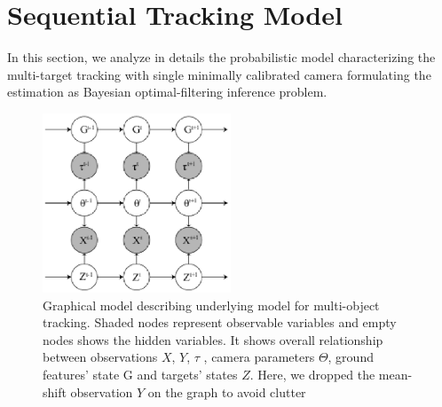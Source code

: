 \section{Sequential Tracking Model}
In this section, we analyze in details the probabilistic model characterizing the  multi-target tracking with single minimally calibrated camera formulating the estimation as  Bayesian optimal-filtering inference problem.\\
\begin{figure}\label{fig: gm_mtt1}
\includegraphics[width=0.5\textwidth]{ImaginiLatex/gm_mtt1.eps} 
\caption{ Graphical model describing underlying model for multi-object tracking. Shaded
nodes represent observable variables and empty nodes shows the hidden variables.
It shows overall relationship between observations $X$, $Y$, $\tau$ , camera parameters $\Theta$, ground features’ state G and targets’ states $Z$. Here, we dropped the mean-shift observation $Y$ on the graph to avoid clutter}
\end{figure}

